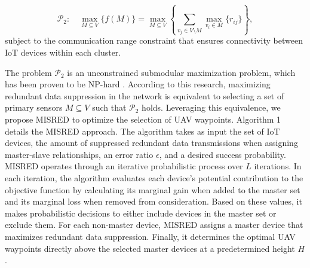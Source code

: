 \documentclass[sigconf]{acmart}
\begin{document}
\begin{equation}
    \mathcal{P}_2:\quad\max_{M\subseteq V}\{f(M)\}=\max_{M\subseteq V}\left\{\sum_{v_j\in V\setminus M}\max_{v_i\in M}\{r_{ij}\}\right\},
\end{equation}
subject to the communication range constraint that ensures connectivity between IoT devices within each cluster.

The problem $\mathcal{P}_2$ is an unconstrained submodular maximization problem, which has been proven to be NP-hard \cite{8-Minimizing_redundant}. According to this research, maximizing redundant data suppression in the network is equivalent to selecting a set of primary sensors $M \subseteq V$ such that $\mathcal{P}_2$ holds. Leveraging this equivalence, we propose MISRED to optimize the selection of UAV waypoints. 
Algorithm 1 details the MISRED approach. The algorithm takes as input the set of IoT devices, the amount of suppressed redundant data transmissions when assigning master-slave relationships, an error ratio $\epsilon$, and a desired success probability. MISRED operates through an iterative probabilistic process over $L$ iterations. In each iteration, the algorithm evaluates each device's potential contribution to the objective function by calculating its marginal gain when added to the master set and its marginal loss when removed from consideration. Based on these values, it makes probabilistic decisions to either include devices in the master set or exclude them. For each non-master device, MISRED assigns a master device that maximizes redundant data suppression. Finally, it determines the optimal UAV waypoints directly above the selected master devices at a predetermined height $H$. %
\end{document}
